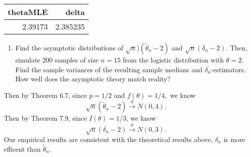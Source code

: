 \documentclass[12pt,]{article}
\newenvironment{Shaded}{\begin{snugshade}}{\end{snugshade}}
\newcommand{\ControlFlowTok}[1]{\textcolor[rgb]{0.13,0.29,0.53}{\textbf{#1}}}
\newcommand{\DataTypeTok}[1]{\textcolor[rgb]{0.13,0.29,0.53}{#1}}
\newcommand{\DecValTok}[1]{\textcolor[rgb]{0.00,0.00,0.81}{#1}}
\newcommand{\KeywordTok}[1]{\textcolor[rgb]{0.13,0.29,0.53}{\textbf{#1}}}
\newcommand{\NormalTok}[1]{#1}
\newcommand{\OperatorTok}[1]{\textcolor[rgb]{0.81,0.36,0.00}{\textbf{#1}}}
\newcommand{\StringTok}[1]{\textcolor[rgb]{0.31,0.60,0.02}{#1}}
\providecommand{\tightlist}{%
  \setlength{\itemsep}{0pt}\setlength{\parskip}{0pt}}
\begin{document}
\begin{longtable}[]{@{}rr@{}}
\toprule
thetaMLE & delta\tabularnewline
\midrule
\endhead
2.39173 & 2.385235\tabularnewline
\bottomrule
\end{longtable}

\begin{enumerate}
\def\labelenumi{(\alph{enumi})}
\setcounter{enumi}{1}
\tightlist
\item
  Find the asymptotic distributions of \(\sqrt{n})(\tilde \theta_n-2)\)
  and \(\sqrt{n}(\delta_n-2)\). Then, simulate 200 samples of size
  \(n=15\) from the logistic distribution with \(\theta=2.\) Find the
  sample variances of the resulting sample medians and
  \(\delta_n\)-estimators. How well does the asymptotic theory match
  reality?
\end{enumerate}

Then by Theorem 6.7, since \(p=1/2\) and \(f(\theta)=1/4,\) we know
\[\sqrt{n}(\tilde\theta_n-2)\overset{d}\rightarrow N(0,4).\] Then by
Theorem 7.9, since \(I(\theta)=1/3\), we know
\[\sqrt{n}(\delta_n-2)\overset{d}\rightarrow N(0,3).\] Our empirical
results are consistent with the theoretical results above, \(\delta_n\)
is more efficent than \(\tilde \theta_n.\)

\begin{Shaded}
\end{Shaded}
\end{document}
